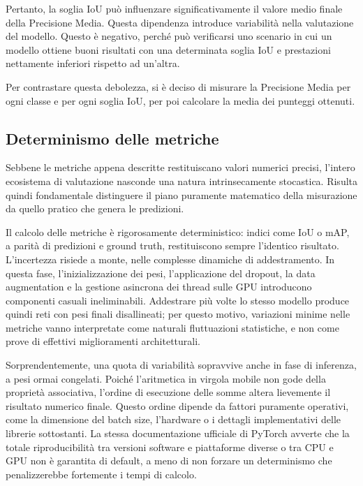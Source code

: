 \noindent
Pertanto, la soglia IoU può influenzare significativamente il valore medio finale della Precisione Media. Questa dipendenza introduce variabilità nella valutazione del modello. Questo è negativo, perché può verificarsi uno scenario in cui un modello ottiene buoni risultati con una determinata soglia IoU e prestazioni nettamente inferiori rispetto ad un'altra.

Per contrastare questa debolezza, si è deciso di misurare la Precisione Media per ogni classe e per ogni soglia IoU, per poi calcolare la media dei punteggi ottenuti. \cite{mAP}

\newpage

\subsection{Determinismo delle metriche}

Sebbene le metriche appena descritte restituiscano valori numerici precisi, l'intero ecosistema di valutazione nasconde una natura intrinsecamente stocastica.
Risulta quindi fondamentale distinguere il piano puramente matematico della misurazione da quello pratico che genera le predizioni.

Il calcolo delle metriche è rigorosamente deterministico: indici come IoU o mAP, a parità di predizioni e ground truth, restituiscono sempre l'identico risultato.
L'incertezza risiede a monte, nelle complesse dinamiche di addestramento. In questa fase, l'inizializzazione dei pesi, l'applicazione del dropout,
la data augmentation e la gestione asincrona dei thread sulle GPU introducono componenti casuali ineliminabili.
Addestrare più volte lo stesso modello produce quindi reti con pesi finali disallineati; per questo motivo, variazioni minime nelle metriche vanno interpretate come naturali fluttuazioni statistiche,
e non come prove di effettivi miglioramenti architetturali. \cite{tf_nondeterminism}

Sorprendentemente, una quota di variabilità sopravvive anche in fase di inferenza, a pesi ormai congelati. Poiché l'aritmetica in virgola mobile non gode della proprietà associativa,
l'ordine di esecuzione delle somme altera lievemente il risultato numerico finale.
Questo ordine dipende da fattori puramente operativi, come la dimensione del batch size, l'hardware o i dettagli implementativi delle librerie sottostanti.
La stessa documentazione ufficiale di PyTorch avverte che la totale riproducibilità tra versioni software e piattaforme diverse o tra CPU e GPU non è garantita di default,
a meno di non forzare un determinismo che penalizzerebbe fortemente i tempi di calcolo. \cite{batch_invariance} \cite{pytorch_randomness}

